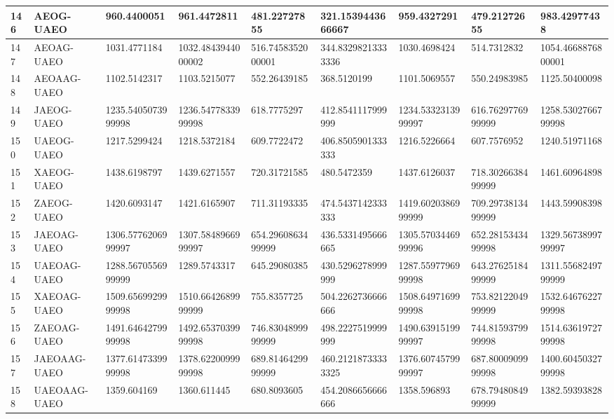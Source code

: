 {\begin{longtable}{|l|l|l|l|l|l|l|l|l|}
        146 & AEOG-UAEO & 960.4400051 & 961.4472811 & 481.22727855 & 321.1539443666667 & 959.4327291 & 479.21272655 & 983.42977438 \\ \hline
        147 & AEOAG-UAEO & 1031.4771184 & 1032.4843944000002 & 516.7458352000001 & 344.83298213333336 & 1030.4698424 & 514.7312832 & 1054.4668876800001 \\ \hline
        148 & AEOAAG-UAEO & 1102.5142317 & 1103.5215077 & 552.26439185 & 368.5120199 & 1101.5069557 & 550.24983985 & 1125.50400098 \\ \hline
        149 & JAEOG-UAEO & 1235.5405073999998 & 1236.5477833999998 & 618.7775297 & 412.8541117999999 & 1234.5332313999997 & 616.7629776999999 & 1258.5302766799998 \\ \hline
        150 & UAEOG-UAEO & 1217.5299424 & 1218.5372184 & 609.7722472 & 406.8505901333333 & 1216.5226664 & 607.7576952 & 1240.51971168 \\ \hline
        151 & XAEOG-UAEO & 1438.6198797 & 1439.6271557 & 720.31721585 & 480.5472359 & 1437.6126037 & 718.3026638499999 & 1461.60964898 \\ \hline
        152 & ZAEOG-UAEO & 1420.6093147 & 1421.6165907 & 711.31193335 & 474.5437142333333 & 1419.6020386999999 & 709.2973813499999 & 1443.59908398 \\ \hline
        153 & JAEOAG-UAEO & 1306.5776206999997 & 1307.5848966999997 & 654.2960863499999 & 436.5331495666665 & 1305.5703446999996 & 652.2815343499998 & 1329.5673899799997 \\ \hline
        154 & UAEOAG-UAEO & 1288.5670556999999 & 1289.5743317 & 645.29080385 & 430.5296278999999 & 1287.5597796999998 & 643.2762518499999 & 1311.5568249799999 \\ \hline
        155 & XAEOAG-UAEO & 1509.6569929999998 & 1510.6642689999999 & 755.8357725 & 504.2262736666666 & 1508.6497169999998 & 753.8212204999999 & 1532.6467622799998 \\ \hline
        156 & ZAEOAG-UAEO & 1491.6464279999998 & 1492.6537039999998 & 746.8304899999999 & 498.2227519999999 & 1490.6391519999997 & 744.8159379999998 & 1514.6361972799998 \\ \hline
        157 & JAEOAAG-UAEO & 1377.6147339999998 & 1378.6220099999998 & 689.8146429999999 & 460.21218733333325 & 1376.6074579999997 & 687.8000909999998 & 1400.6045032799998 \\ \hline
        158 & UAEOAAG-UAEO & 1359.604169 & 1360.611445 & 680.8093605 & 454.2086656666666 & 1358.596893 & 678.7948084999999 & 1382.59393828 \\ \hline

\end{longtable}}
